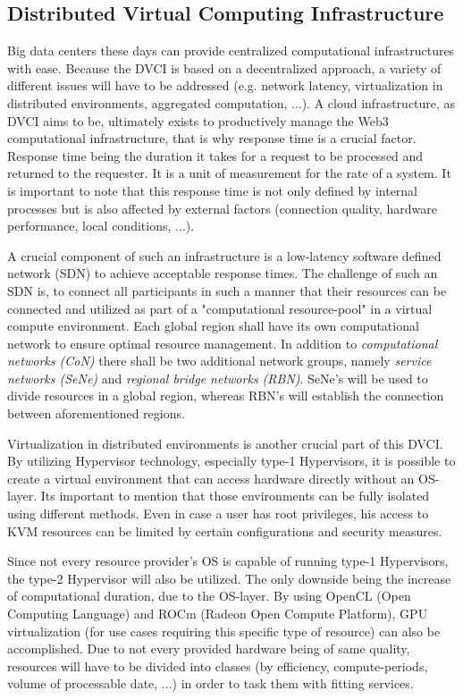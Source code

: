 \documentclass[]{article}
\begin{document}
\subsection{Distributed Virtual Computing Infrastructure}
Big data centers these days can provide centralized computational infrastructures with ease.
Because the DVCI is based on a decentralized approach, a variety of different issues will have to be addressed (e.g. network latency, virtualization in distributed environments, aggregated computation, ...).
A cloud infrastructure, as DVCI aims to be, ultimately exists to productively manage the Web3 computational infrastructure, that is why response time is a crucial factor. 
Response time being the duration it takes for a request to be processed and returned to the requester.
It is a unit of measurement for the rate of a system. 
It is important to note that this response time is not only defined by internal processes but is also affected by external factors (connection quality, hardware performance, local conditions, ...).

A crucial component of such an infrastructure is a low-latency software defined network (SDN) to achieve acceptable response times.
The challenge of such an SDN is, to connect all participants in such a manner that their resources can be connected and utilized as part of a "computational resource-pool" in a virtual compute environment.
Each global region shall have its own computational network to ensure optimal resource management.
In addition to \textit{computational networks (CoN)} there shall be two additional network groups, namely \textit{service networks (SeNe)} and \textit{regional bridge networks (RBN)}.
SeNe's will be used to divide resources in a global region, whereas RBN's will establish the connection between aforementioned regions.

Virtualization in distributed environments is another crucial part of this DVCI.
By utilizing Hypervisor technology, especially type-1 Hypervisors, it is possible to create a virtual environment that can access hardware directly without an OS-layer.
Its important to mention that those environments can be fully isolated using different methods.
Even in case a user has root privileges, his access to KVM resources can be limited by certain configurations and security measures.

Since not every resource provider's OS is capable of running type-1 Hypervisors, the type-2 Hypervisor will also be utilized.
The only downside being the increase of computational duration, due to the OS-layer.
By using OpenCL (Open Computing Language) and ROCm (Radeon Open Compute Platform), GPU virtualization (for use cases requiring this specific type of resource) can also be accomplished.
Due to not every provided hardware being of same quality, resources will have to be divided into classes (by efficiency, compute-periods, volume of processable date, ...) in order to task them with fitting services.
\end{document}
